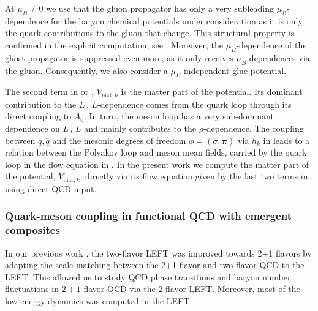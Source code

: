 \documentclass[reprint,twocolumn,superscriptaddress,preprintnumbers,amsmath,amssymb,aps,prd,floatfix]{revtex4-2}
\begin{document}
At $\mu_B\neq 0$ we use that the gluon propagator has only a very subleading $\mu_B$-dependence for the baryon chemical potentials under consideration as it is only the quark contributions to the gluon that change. This structural property is confirmed in the explicit computation, see \cite{Fu:2019hdw}. Moreover, the $\mu_B$-dependence of the ghost propagator is suppressed even more, as it only receives $\mu_B$-dependences via the gluon. Consequently, we also consider a $\mu_B$-independent glue potential.

The second term in  or , $V_{\textrm{mat},k}$ is the matter part of the potential. Its dominant contribution to the $L\,,\,\bar L$-dependence comes from the quark loop through its direct coupling to $A_0$. In turn, the meson loop has a very sub-dominant dependence on $L\,,\,\bar L$ and mainly contributes to the $\rho$-dependence. The coupling between $q,\bar q$ and the mesonic degrees of freedom $\phi=(\sigma, \bm\pi)$ via $h_k$ in  leads to a relation between the Polyakov loop  and meson mean fields, carried by the quark loop in the flow equation in . In the present work we compute the matter part of the potential, $V_{\textrm{mat},k}$, directly via its flow equation given by the last two terms in , using direct  QCD input.

\subsubsection{Quark-meson coupling in functional QCD with emergent composites}
\label{app:Yukawa}

In our previous work \cite{Fu:2021oaw}, the two-flavor LEFT was improved towards 2+1 flavors by adapting the scale matching between the 2+1-flavor and two-flavor QCD to the LEFT. This allowed us to study QCD phase transitions and baryon number fluctuations in $2+1$-flavor QCD via the $2$-flavor LEFT. Moreover, most of the low energy dynamics was computed in the LEFT. 
\end{document}
